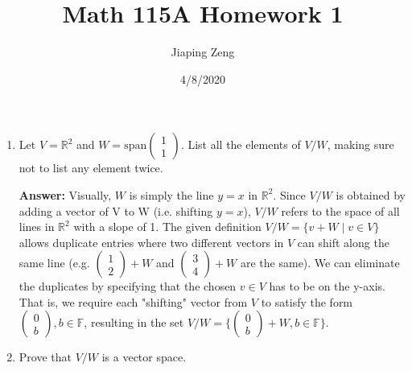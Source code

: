\documentclass{article}
\title{Math 115A Homework 1}
\date{4/8/2020}
\author{Jiaping Zeng}
\begin{document}
\maketitle

\begin{enumerate}
      \item
            Let $V=\mathbb{R}^2$ and $W=\text{span} \begin{pmatrix} 1 \\ 1 \end{pmatrix}$. List all the elements of $V/W$, making sure not to list any element twice.

            \textbf{Answer: } Visually, $W$ is simply the line $y=x$ in $\mathbb{R}^2$. Since $V/W$ is obtained by adding a vector of V to W (i.e. shifting $y=x$), $V/W$ refers to the space of all lines in $\mathbb{R}^2$ with a slope of 1. The given definition $V/W=\{v+W \mid v \in V\}$ allows duplicate entries where two different vectors in $V$ can shift along the same line (e.g. $\begin{pmatrix} 1 \\ 2 \end{pmatrix}+W$ and $\begin{pmatrix} 3 \\ 4 \end{pmatrix}+W$ are the same). We can eliminate the duplicates by specifying that the chosen $v \in V$ has to be on the y-axis. That is, we require each "shifting" vector from $V$ to satisfy the form $\begin{pmatrix} 0 \\ b \end{pmatrix}, b \in \mathbb{F}$, resulting in the set $V/W=\{\begin{pmatrix} 0 \\ b \end{pmatrix}+W, b \in \mathbb{F}\}$.

      \item
            Prove that $V/W$ is a vector space.


\end{enumerate}
\end{document}
